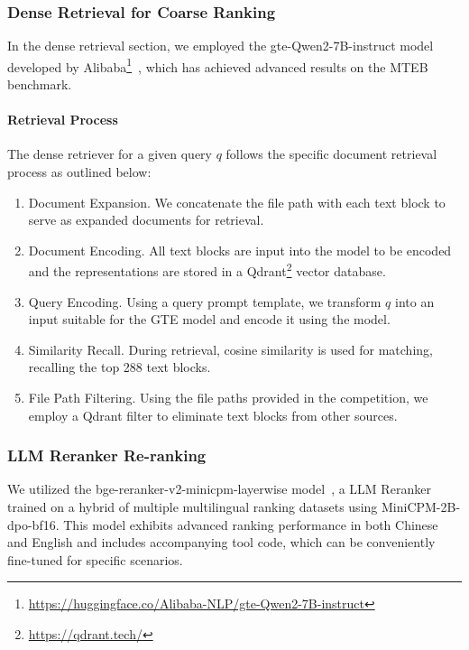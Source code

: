 \documentclass[11pt]{article}
\begin{document}
\subsubsection{Dense Retrieval for Coarse Ranking}

In the dense retrieval section, we employed the gte-Qwen2-7B-instruct model developed by Alibaba\footnote{\href{https://huggingface.co/Alibaba-NLP/gte-Qwen2-7B-instruct}{https://huggingface.co/Alibaba-NLP/gte-Qwen2-7B-instruct}}~\cite{li2023towards}, which has achieved advanced results on the MTEB benchmark.

\paragraph{Retrieval Process} The dense retriever for a given query $q$ follows the specific document retrieval process as outlined below:
\begin{enumerate}
    \item Document Expansion. We concatenate the file path with each text block to serve as expanded documents for retrieval.
    \item Document Encoding. All text blocks are input into the model to be encoded and the representations are stored in a Qdrant\footnote{\href{https://qdrant.tech/}{https://qdrant.tech/}} vector database.
    \item Query Encoding. Using a query prompt template, we transform $q$ into an input suitable for the GTE model and encode it using the model.
    \item Similarity Recall. During retrieval, cosine similarity is used for matching, recalling the top 288 text blocks.
    \item File Path Filtering. Using the file paths provided in the competition, we employ a Qdrant filter to eliminate text blocks from other sources.
\end{enumerate}

\subsubsection{LLM Reranker Re-ranking}

We utilized the bge-reranker-v2-minicpm-layerwise model~\cite{chen2024bge}, a LLM Reranker trained on a hybrid of multiple multilingual ranking datasets using MiniCPM-2B-dpo-bf16. This model exhibits advanced ranking performance in both Chinese and English and includes accompanying tool code, which can be conveniently fine-tuned for specific scenarios.
\end{document}

